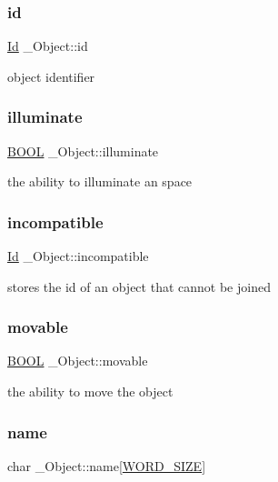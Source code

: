 \subsubsection{\texorpdfstring{id}{id}}
{\footnotesize\ttfamily \hyperlink{types_8h_a845e604fb28f7e3d97549da3448149d3}{Id} \+\_\+\+Object\+::id}

object identifier \mbox{\label{struct__Object_a6e4edc37e6d8a5237a501c432a4296ca}} 
\subsubsection{\texorpdfstring{illuminate}{illuminate}}
{\footnotesize\ttfamily \hyperlink{types_8h_a3e5b8192e7d9ffaf3542f1210aec18dd}{B\+O\+OL} \+\_\+\+Object\+::illuminate}

the ability to illuminate an space \mbox{\label{struct__Object_a2811b54563806d9ed618af6a78114898}} 
\subsubsection{\texorpdfstring{incompatible}{incompatible}}
{\footnotesize\ttfamily \hyperlink{types_8h_a845e604fb28f7e3d97549da3448149d3}{Id} \+\_\+\+Object\+::incompatible}

stores the id of an object that cannot be joined \mbox{\label{struct__Object_ae013850f78da07c39e530f36bf98f2b9}} 
\subsubsection{\texorpdfstring{movable}{movable}}
{\footnotesize\ttfamily \hyperlink{types_8h_a3e5b8192e7d9ffaf3542f1210aec18dd}{B\+O\+OL} \+\_\+\+Object\+::movable}

the ability to move the object \mbox{\label{struct__Object_a3dab853826b88558a2c07dec50b96d57}} 
\subsubsection{\texorpdfstring{name}{name}}
{\footnotesize\ttfamily char \+\_\+\+Object\+::name\mbox{[}\hyperlink{types_8h_a92ed8507d1cd2331ad09275c5c4c1c89}{W\+O\+R\+D\+\_\+\+S\+I\+ZE}\mbox{]}}

